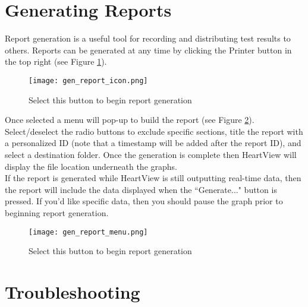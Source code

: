 \documentclass[11pt,fleqn]{book} %
\begin{document}


\section{Generating Reports}\label{sec:generating_report}

Report generation is a useful tool for recording and distributing test results to others. Reports can be generated at any time by clicking the Printer button in the top right (see Figure \ref{fig:gen_report_icon}).

\begin{figure}[h]
	\centering\texttt{[image: gen\_report\_icon.png]}
	\caption{Select this button to begin report generation}
	\label{fig:gen_report_icon} %
\end{figure}

Once selected a menu will pop-up to build the report (see Figure \ref{fig:gen_report_menu}). Select/deselect the radio buttons to exclude specific sections, title the report with a personalized ID (note that a timestamp will be added after the report ID), and select a destination folder. Once the generation is complete then HeartView will display the file location underneath the graphs.\\ 

If the report is generated while HeartView is still outputting real-time data, then the report will include the data displayed when the ``Generate..." button is pressed. If you'd like specific data, then you should pause the graph prior to beginning report generation. 

\begin{figure}[h]
	\centering\texttt{[image: gen\_report\_menu.png]}
	\caption{Select this button to begin report generation}
	\label{fig:gen_report_menu} %
\end{figure}


\section{Troubleshooting}
\end{document}
